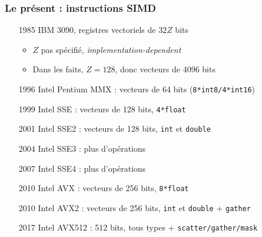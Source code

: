 \documentclass[xcolor={x11names,svgnames}]{beamer}
\begin{document}
\begin{frame}
  \frametitle{Le présent : instructions SIMD}

  \begin{enumerate}
  \item[1985] IBM 3090, registres vectoriels de $32 Z$ bits
    \begin{itemize}
    \item $Z$ \alert{pas spécifié}, \textit{implementation-dependent}
    \item Dans les faits, $Z=128$, donc vecteurs de 4096 bits
    \end{itemize}
  \end{enumerate}

  \medskip
    \begin{overlayarea}{\textwidth}{6cm}
    \pause
    \pause

    \begin{enumerate}  
    \item[1996] Intel Pentium MMX : vecteurs de 64 bits (\texttt{8*int8/4*int16})
      \pause
    \item[1999] Intel SSE : vecteurs de 128 bits, \texttt{4*float}
    \item[2001] Intel SSE2 : vecteurs de 128 bits, \texttt{int} et \texttt{double}
    \item[2004] Intel SSE3 : plus d'opérations
    \item[2007] Intel SSE4 : plus d'opérations
    \item[2010] Intel AVX : vecteurs de 256 bits, \texttt{8*float}
    \item[2010] Intel AVX2 : vecteurs de 256 bits, \texttt{int} et \texttt{double} + \texttt{gather}
    \item[2017] Intel AVX512 : 512 bits, tous types + \texttt{scatter/gather/mask}
  \end{enumerate}
\end{overlayarea}

\end{frame}
\end{document}
